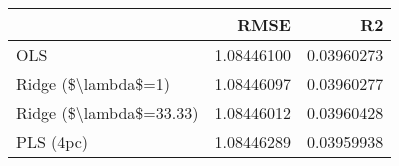 \begin{tabular}{lrr}
\toprule
{} &        RMSE &          R2 \\
\midrule
OLS                     &  1.08446100 &  0.03960273 \\
Ridge (\$\textbackslash lambda\$=1)     &  1.08446097 &  0.03960277 \\
Ridge (\$\textbackslash lambda\$=33.33) &  1.08446012 &  0.03960428 \\
PLS (4pc)               &  1.08446289 &  0.03959938 \\
\bottomrule
\end{tabular}
